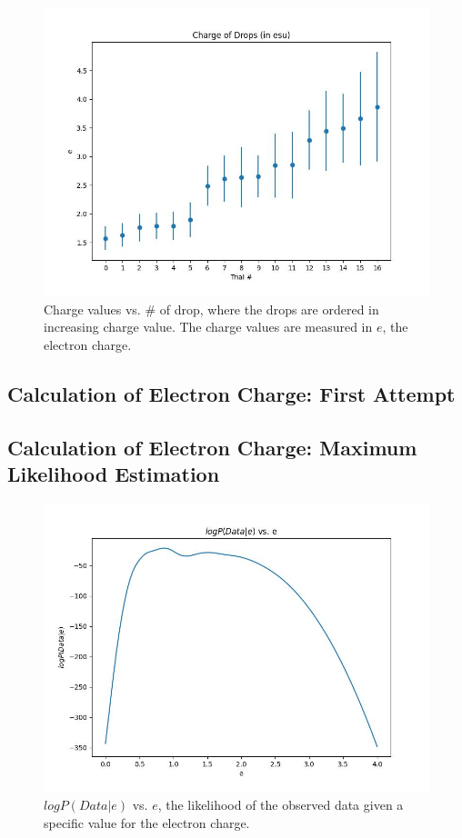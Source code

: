 \documentclass{article}
\begin{document}
\begin{figure}[h]
	\includegraphics[width=\columnwidth]{drop_charge.jpg}
    \caption{Charge values vs. \# of drop, where the drops are ordered in increasing charge value. The charge values are measured in $e$, the electron charge.}
    \label{fig:order}
\end{figure}

\subsection{Calculation of Electron Charge: First Attempt}
\label{sec:attempt1}

\subsection{Calculation of Electron Charge: Maximum Likelihood Estimation}
\label{sec:bayesian}

\begin{figure}[h]
	\includegraphics[width=\columnwidth]{mle.jpg}
    \caption{$log P(Data|e)$ vs. $e$, the likelihood of the observed data given a specific value for the electron charge.}
    \label{fig:mle}
\end{figure}
\end{document}

